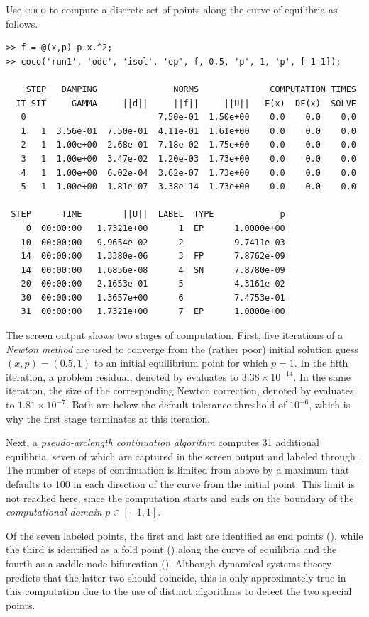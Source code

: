 Use \textsc{coco} to compute a discrete set of points along the curve of equilibria as follows.
\begin{lstlisting}[language=coco-highlight,frame=lines]
>> f = @(x,p) p-x.^2;
>> coco('run1', 'ode', 'isol', 'ep', f, 0.5, 'p', 1, 'p', [-1 1]);

    STEP   DAMPING               NORMS              COMPUTATION TIMES
  IT SIT     GAMMA     ||d||     ||f||     ||U||   F(x)  DF(x)  SOLVE
   0                          7.50e-01  1.50e+00    0.0    0.0    0.0
   1   1  3.56e-01  7.50e-01  4.11e-01  1.61e+00    0.0    0.0    0.0
   2   1  1.00e+00  2.68e-01  7.18e-02  1.75e+00    0.0    0.0    0.0
   3   1  1.00e+00  3.47e-02  1.20e-03  1.73e+00    0.0    0.0    0.0
   4   1  1.00e+00  6.02e-04  3.62e-07  1.73e+00    0.0    0.0    0.0
   5   1  1.00e+00  1.81e-07  3.38e-14  1.73e+00    0.0    0.0    0.0

 STEP      TIME        ||U||  LABEL  TYPE             p
    0  00:00:00   1.7321e+00      1  EP      1.0000e+00
   10  00:00:00   9.9654e-02      2          9.7411e-03
   14  00:00:00   1.3380e-06      3  FP      7.8762e-09
   14  00:00:00   1.6856e-08      4  SN      7.8780e-09
   20  00:00:00   2.1653e-01      5          4.3161e-02
   30  00:00:00   1.3657e+00      6          7.4753e-01
   31  00:00:00   1.7321e+00      7  EP      1.0000e+00
\end{lstlisting}
The screen output shows two stages of computation. First, five iterations of a \textit{Newton method} are used to converge from the (rather poor) initial solution guess $(x,p)=(0.5,1)$ to an initial equilibrium point for which $p=1$. In the fifth iteration, a problem residual, denoted by  evaluates to $3.38\times10^{-14}$. In the same iteration, the size of the corresponding Newton correction, denoted by  evaluates to $1.81\times10^{-7}$. Both are below the default tolerance threshold of $10^{-6}$, which is why the first stage terminates at this iteration. 

Next, a \textit{pseudo-arclength continuation algorithm} computes 31 additional equilibria, seven of which are captured in the screen output and labeled  through . The number of steps of continuation is limited from above by a maximum that defaults to 100 in each direction of the curve from the initial point. This limit is not reached here, since the computation starts and ends on the boundary of the \textit{computational domain} $p\in[-1,1]$. 

Of the seven labeled points, the first and last are identified as end points (), while the third is identified as a fold point () along the curve of equilibria and the fourth as a saddle-node bifurcation (). Although dynamical systems theory predicts that the latter two should coincide, this is only approximately true in this computation due to the use of distinct algorithms to detect the two special points.

